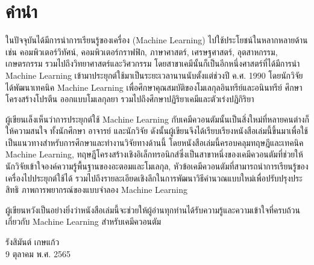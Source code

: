 

{

\chapter*{\centering คำนำ}

ในปัจจุบันได้มีการนำการเรียนรู้ของเครื่อง (Machine Learning) ไปใช้ประโยชน์ในหลากหลายด้าน เช่น คอมพิวเตอร์วิทัศน์, คอมพิวเตอร์กราฟฟิก, 
ภาษาศาสตร์, เศรษฐศาสตร์, อุตสาหกรรม, เกษตรกรรม รวมไปถึงวิทยาศาสตร์และวิศวกรรม โดยสาขาเคมีนั้นก็เป็นอีกหนึ่งศาสตร์ที่ได้มีการนำ 
Machine Learning เข้ามาประยุกต์ใช้มาเป็นระยะเวลานานนับตั้งแต่ช่วงปี ค.ศ. 1990 โดยนักวิจัยได้พัฒนาเทคนิค Machine Learning 
เพื่อศึกษาคุณสมบัติของโมเลกุลอินทรีย์และอนินทรีย์ ศึกษาโครงสร้างโปรตีน ออกแบบโมเลกุลยา รวมไปถึงศึกษาปฏิริยาเคมีและตัวเร่งปฏิกิริยา

ผู้เขียนเล็งเห็นว่าการประยุกต์ใช้ Machine Learning กับเคมีควอนตัมนั้นเป็นสิ่งใหม่ที่หลายคนต่างก็ให้ความสนใจ ทั้งนักศึกษา อาจารย์ และนักวิจัย 
ดังนั้นผู้เขียนจึงได้เรียบเรียงหนังสือเล่มนี้ขึ้นมาเพื่อใช้เป็นแนวทางสำหรับการศึกษาและทำงานวิจัยทางด้านนี้ โดยหนังสือเล่มนี้ครอบคลุมทฤษฎีและเทคนิค 
Machine Learning, ทฤษฎีโครงสร้างเชิงอิเล็กทรอนิกส์ซึ่งเป็นสาขาหนึ่งของเคมีควอนตัมที่ช่วยให้นักวิจัยเข้าใจองค์ความรู้พื้นฐานของอะตอมและโมเลกุล, 
หัวข้อเคมีควอนตัมที่สามารถนำการเรียนรู้ของเครื่องไปประยุกต์ใช้ได้ รวมไปถึงรายละเอียดเชิงลึกในการพัฒนาวิธีคำนวณแบบใหม่เพื่อปรับปรุงประสิทธิ%
ภาพการพยากรณ์ของแบบจำลอง Machine Learning

ผู้เขียนหวังเป็นอย่างยิ่งว่าหนังสือเล่มนี้จะช่วยให้ผู้อ่านทุกท่านได้รับความรู้และความเข้าใจที่ครบถ้วนเกี่ยวกับ Machine Learning สำหรับเคมีควอนตัม

\medskip

\begin{flushright}
รังสิมันต์ เกษแก้ว \\
9 ตุลาคม พ.ศ. 2565
\end{flushright}
}
